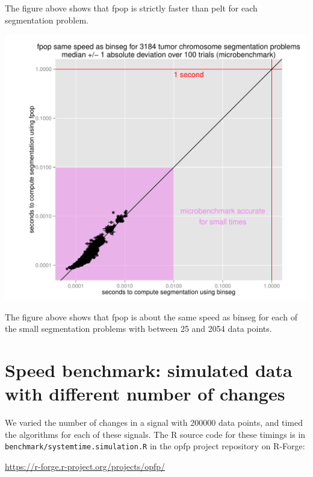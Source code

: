 \documentclass{article}
\begin{document}
The figure above shows that fpop is strictly faster than pelt for each
segmentation problem.

\begin{center}
  \includegraphics[width=\textwidth]{figure-microbenchmark-arrays-fpop-binseg}
\end{center}

The figure above shows that fpop is about the same speed as binseg for
each of the small segmentation problems with between 25 and 2054 data
points.


\newpage

\section{Speed benchmark: simulated data with different 
  number of changes}

We varied the number of changes in a signal with 200000 data points,
and timed the algorithms for each of these signals. The R source code
for these timings is in \verb|benchmark/systemtime.simulation.R| in
the opfp project repository on R-Forge:

\url{https://r-forge.r-project.org/projects/opfp/}
\end{document}
